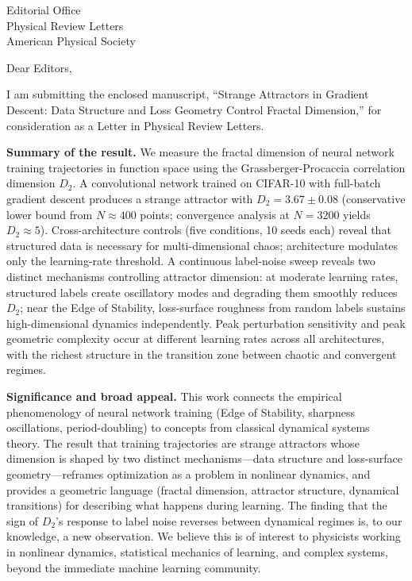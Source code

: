 \documentclass[11pt]{letter}
\begin{document}
\begin{letter}{%
Editorial Office\\
Physical Review Letters\\
American Physical Society}

\opening{Dear Editors,}

I am submitting the enclosed manuscript, ``Strange Attractors in Gradient Descent: Data Structure and Loss Geometry Control Fractal Dimension,'' for consideration as a Letter in Physical Review Letters.

\textbf{Summary of the result.} We measure the fractal dimension of neural network training trajectories in function space using the Grassberger-Procaccia correlation dimension $D_2$. A convolutional network trained on CIFAR-10 with full-batch gradient descent produces a strange attractor with $D_2 = 3.67 \pm 0.08$ (conservative lower bound from $N \approx 400$ points; convergence analysis at $N = 3200$ yields $D_2 \approx 5$). Cross-architecture controls (five conditions, 10 seeds each) reveal that structured data is necessary for multi-dimensional chaos; architecture modulates only the learning-rate threshold. A continuous label-noise sweep reveals two distinct mechanisms controlling attractor dimension: at moderate learning rates, structured labels create oscillatory modes and degrading them smoothly reduces $D_2$; near the Edge of Stability, loss-surface roughness from random labels sustains high-dimensional dynamics independently. Peak perturbation sensitivity and peak geometric complexity occur at different learning rates across all architectures, with the richest structure in the transition zone between chaotic and convergent regimes.

\textbf{Significance and broad appeal.} This work connects the empirical phenomenology of neural network training (Edge of Stability, sharpness oscillations, period-doubling) to concepts from classical dynamical systems theory. The result that training trajectories are strange attractors whose dimension is shaped by two distinct mechanisms---data structure and loss-surface geometry---reframes optimization as a problem in nonlinear dynamics, and provides a geometric language (fractal dimension, attractor structure, dynamical transitions) for describing what happens during learning. The finding that the sign of $D_2$'s response to label noise reverses between dynamical regimes is, to our knowledge, a new observation. We believe this is of interest to physicists working in nonlinear dynamics, statistical mechanics of learning, and complex systems, beyond the immediate machine learning community.


\end{letter}
\end{document}
